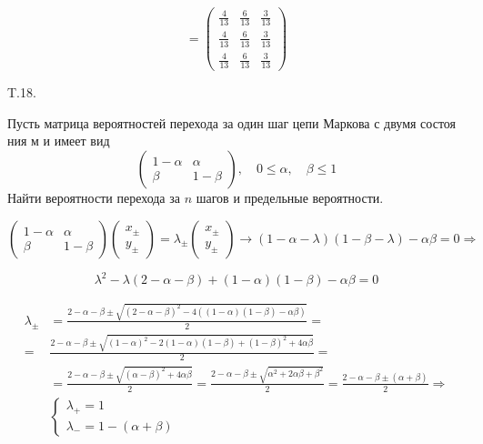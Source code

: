 \documentclass[a4paper,12pt]{article} %
\begin{document}
\begin{example}
\[ =\left(\begin{array}{ccc}
\frac{4}{13} & \frac{6}{13} & \frac{3}{13} \\
\frac{4}{13} & \frac{6}{13} & \frac{3}{13} \\
\frac{4}{13} & \frac{6}{13} & \frac{3}{13}
\end{array}\right) \]






\end{example}



\begin{example} T.18. 

Пусть матрица вероятностей перехода за один шаг цепи Маркова с двумя состоя ния м и имеет вид
$$
\left(\begin{array}{cc}
1-\alpha & \alpha \\
\beta & 1-\beta
\end{array}\right), \quad 0 \leqslant \alpha, \quad \beta \leqslant 1
$$
Найти вероятности перехода за $n$ шагов и предельные вероятности.



$$
\left(\begin{array}{cc}
1-\alpha & \alpha \\
\beta & 1-\beta
\end{array}\right)
\left(\begin{array}{l}
x_{\pm} \\
y_{\pm}
\end{array}\right)
=
\lambda_{\pm}
\left(\begin{array}{l}
x_{\pm} \\
y_{\pm}
\end{array}\right) \rightarrow(1-\alpha-\lambda)(1-\beta-\lambda)-\alpha \beta=0 
\Rightarrow 
$$


\[ \lambda^{2}-\lambda(2-\alpha-\beta)+(1-\alpha)(1-\beta)-\alpha \beta=0  \]

$$
\begin{aligned}
\lambda_{\pm} &=\frac{2-\alpha-\beta \pm \sqrt{(2-\alpha-\beta)^{2}-4((1-\alpha)(1-\beta)-\alpha \beta)}}{2}=\\
=&\frac{2-\alpha-\beta \pm \sqrt{(1-\alpha)^{2}-2(1-\alpha)(1-\beta)+(1-\beta)^{2}+4 \alpha \beta}}{2}=\\
&=\frac{2-\alpha-\beta \pm \sqrt{(\alpha-\beta)^{2}+4 \alpha \beta}}{2}=\frac{2-\alpha-\beta \pm \sqrt{\alpha^{2}+2 \alpha \beta+\beta^{2}}}{2}=\frac{2-\alpha-\beta \pm(\alpha+\beta)}{2} \Rightarrow \\
&\left\{\begin{array}{l}
	\lambda_{+}=1 \\
	\lambda_{-}=1-(\alpha+\beta)
\end{array}\right.
\end{aligned}
$$



\end{example}
\end{document}
